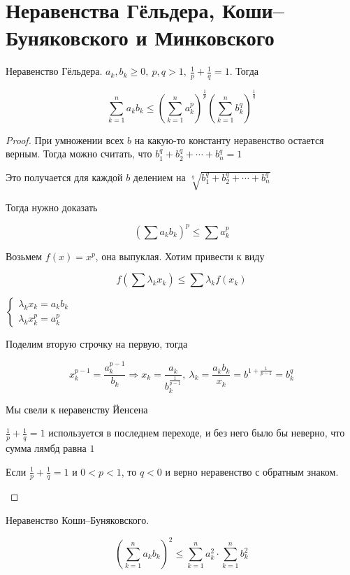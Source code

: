 \section{Неравенства Гёльдера, Коши–Буняковского и Минковского}

\begin{theorem-non}
    Неравенство Гёльдера. 
    $a_k, b_k \geqslant 0,\ p, q > 1,\ \frac{1}{p}+\frac{1}{q} = 1$. Тогда
    
    \[ \sum_{k=1}^{n} a_k b_k \leqslant \left( \sum_{k=1}^{n} a_k^p\right)^\frac{1}{p} \left( \sum_{k=1}^{n} b_k^q\right)^\frac{1}{q} \]
\end{theorem-non}

\begin{proof}
    При умножении всех $b$ на какую-то константу неравенство остается верным. Тогда можно считать, что $b_1^q+b_2^q+\cdots+b_n^q=1$

    Это получается для каждой $b$ делением на $\sqrt[q]{b_1^q+b_2^q+\cdots+b_n^q}$

    Тогда нужно доказать

    \[ \left(\sum a_k b_k \right)^p \leqslant \sum a_k^p \]

    Возьмем $f(x) = x^p$, она выпуклая. Хотим привести к виду

    \[ f(\sum \lambda_k x_k) \leqslant \sum \lambda_k f(x_k) \]

    $
    \begin{cases}
        \lambda_k x_k = a_k b_k \\
        \lambda_k x_k^p = a_k^p
    \end{cases}
    $

    Поделим вторую строчку на первую, тогда

    \[ x_k^{p-1} = \frac{a_k^{p-1}}{b_k} \Rightarrow x_k = \frac{a_k}{b_k^{\frac{1}{p-1}}},\ 
    \lambda_k = \frac{a_k b_k}{x_k} = b^{1+\frac{1}{p-1}} = b_k^q\]

    Мы свели к неравенству Йенсена

    $\frac{1}{p}+\frac{1}{q} = 1$ используется в последнем переходе, и без него было бы неверно, что сумма лямбд равна $1$

    \begin{notice}
        Если $\frac{1}{p}+\frac{1}{q} = 1$ и $0 < p < 1$, то $q < 0$ и верно неравенство с обратным знаком.
    \end{notice}
\end{proof}

\begin{theorem-non}
    Неравенство Коши–Буняковского.

    \[ (\sum_{k=1}^{n} a_k b_k)^2 \leqslant \sum_{k=1}^{n} a_k^2 \cdot \sum_{k=1}^{n}b_k^2 \]
\end{theorem-non}

